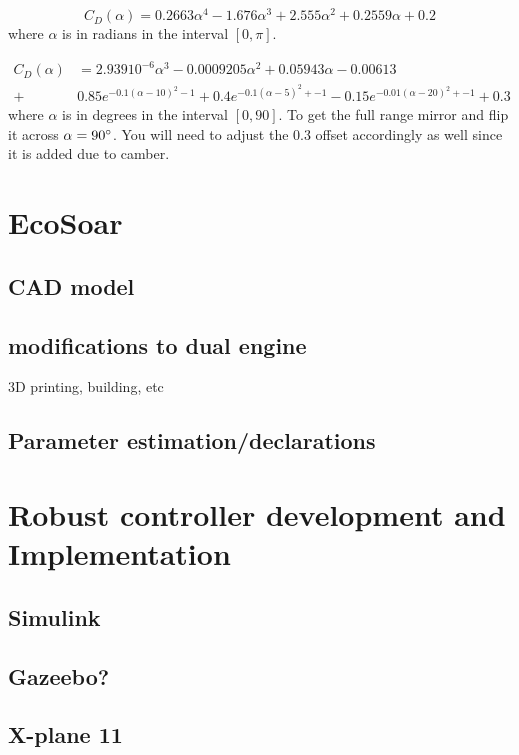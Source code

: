 \documentclass{article}
\begin{document}
\begin{equation}
C_D(\alpha) = 0.2663 \alpha^4 -1.676 \alpha^3 + 2.555 \alpha^2 + 0.2559 \alpha + 0.2%
\end{equation}
where $\alpha$ is in radians in the interval $[0,\pi]$.

\begin{equation}\begin{split}
    C_D(\alpha) &= 2.939 10^{-6} \alpha^3 -0.0009205 \alpha^2 + 0.05943 \alpha -0.00613 \\
    +&
    0.85 e^{ -0.1 (\alpha - 10)^2 - 1 } + 0.4 e^{ -0.1 (\alpha - 5)^2 + -1 } - 0.15 e^{ -0.01 (\alpha - 20)^2 + -1 }
    + 0.3
\end{split}\end{equation}
where $\alpha$ is in degrees in the interval $[0,90]$.
To get the full range mirror and flip it across $\alpha = 90 \degree$.
You will need to adjust the $0.3$ offset accordingly as well since it is added due to camber.



\section{EcoSoar}
\subsection{CAD model}
\subsection{modifications to dual engine}
3D printing, building, etc
\subsection{Parameter estimation/declarations}

\section{\textbf{Robust controller development and Implementation}}
\subsection{Simulink}
\subsection{Gazeebo?}
\subsection{X-plane 11}
\end{document}
